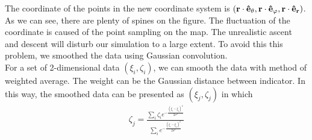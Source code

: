 \documentclass{mcmthesis}
\begin{document}
  The coordinate of the points in the new coordinate system is $({\bf r}\cdot {\bf \hat{e}_{\theta}}, {\bf r}\cdot {\bf \hat{e}_{\varphi}}, {\bf r}\cdot {\bf \hat{e}_{r}})$.\\

  As we can see, there are plenty of spines on the figure. The fluctuation of the coordinate is caused of the point sampling on the map. The unrealistic ascent and descent will disturb our simulation to a large extent. To avoid this this problem, we smoothed the data using Gaussian convolution. \\
  For a set of 2-dimensional data $(\xi_{i}, \zeta_{i})$, we can smooth the data with method of weighted average. The weight can be the Gaussian distance between indicator. In this way, the smoothed data can be presented as $(\xi_{j}, \zeta_{j})$ in which
  \begin{equation}
    \begin{aligned}
      \zeta_{j} = \frac{\sum_{i} \zeta_{i} e^{-\frac{(\xi_{i} - \xi_{j})^2}{2 \sigma^{2}}}}{\sum _{i} e^{- \frac{(\xi_{i} - \xi_{j})^{2}}{2 \sigma^{2}}}}
    \end{aligned}
  \end{equation}


  
\end{document}
